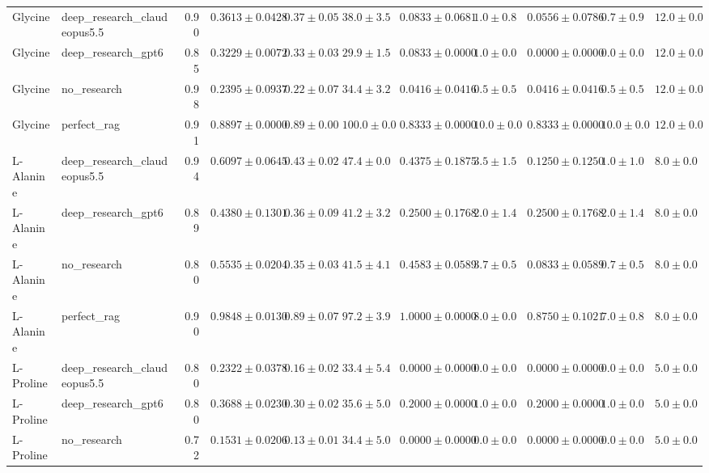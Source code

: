 \begin{table}[htbp]
\begin{tabular}{llrrrrrrrrr}
\midrule
Glycine & deep_research_claudeopus5.5 & 0.90 & $0.3613 \pm 0.0428$ & $0.37 \pm 0.05$ & $38.0 \pm 3.5$ & $0.0833 \pm 0.0681$ & $1.0 \pm 0.8$ & $0.0556 \pm 0.0786$ & $0.7 \pm 0.9$ & $12.0 \pm 0.0$ \\
Glycine & deep_research_gpt6 & 0.85 & $0.3229 \pm 0.0072$ & $0.33 \pm 0.03$ & $29.9 \pm 1.5$ & $0.0833 \pm 0.0000$ & $1.0 \pm 0.0$ & $0.0000 \pm 0.0000$ & $0.0 \pm 0.0$ & $12.0 \pm 0.0$ \\
Glycine & no_research & 0.98 & \cellcolor{red!25}$0.2395 \pm 0.0937$ & $0.22 \pm 0.07$ & $34.4 \pm 3.2$ & $0.0416 \pm 0.0416$ & $0.5 \pm 0.5$ & $0.0416 \pm 0.0416$ & $0.5 \pm 0.5$ & $12.0 \pm 0.0$ \\
Glycine & perfect_rag & 0.91 & \cellcolor{green!25}$0.8897 \pm 0.0000$ & $0.89 \pm 0.00$ & $100.0 \pm 0.0$ & $0.8333 \pm 0.0000$ & $10.0 \pm 0.0$ & $0.8333 \pm 0.0000$ & $10.0 \pm 0.0$ & $12.0 \pm 0.0$ \\
\midrule
L-Alanine & deep_research_claudeopus5.5 & 0.94 & $0.6097 \pm 0.0645$ & $0.43 \pm 0.02$ & $47.4 \pm 0.0$ & $0.4375 \pm 0.1875$ & $3.5 \pm 1.5$ & $0.1250 \pm 0.1250$ & $1.0 \pm 1.0$ & $8.0 \pm 0.0$ \\
L-Alanine & deep_research_gpt6 & 0.89 & \cellcolor{red!25}$0.4380 \pm 0.1301$ & $0.36 \pm 0.09$ & $41.2 \pm 3.2$ & $0.2500 \pm 0.1768$ & $2.0 \pm 1.4$ & $0.2500 \pm 0.1768$ & $2.0 \pm 1.4$ & $8.0 \pm 0.0$ \\
L-Alanine & no_research & 0.80 & $0.5535 \pm 0.0204$ & $0.35 \pm 0.03$ & $41.5 \pm 4.1$ & $0.4583 \pm 0.0589$ & $3.7 \pm 0.5$ & $0.0833 \pm 0.0589$ & $0.7 \pm 0.5$ & $8.0 \pm 0.0$ \\
L-Alanine & perfect_rag & 0.90 & \cellcolor{green!25}$0.9848 \pm 0.0130$ & $0.89 \pm 0.07$ & $97.2 \pm 3.9$ & $1.0000 \pm 0.0000$ & $8.0 \pm 0.0$ & $0.8750 \pm 0.1021$ & $7.0 \pm 0.8$ & $8.0 \pm 0.0$ \\
\midrule
L-Proline & deep_research_claudeopus5.5 & 0.80 & $0.2322 \pm 0.0378$ & $0.16 \pm 0.02$ & $33.4 \pm 5.4$ & $0.0000 \pm 0.0000$ & $0.0 \pm 0.0$ & $0.0000 \pm 0.0000$ & $0.0 \pm 0.0$ & $5.0 \pm 0.0$ \\
L-Proline & deep_research_gpt6 & 0.80 & $0.3688 \pm 0.0230$ & $0.30 \pm 0.02$ & $35.6 \pm 5.0$ & $0.2000 \pm 0.0000$ & $1.0 \pm 0.0$ & $0.2000 \pm 0.0000$ & $1.0 \pm 0.0$ & $5.0 \pm 0.0$ \\
L-Proline & no_research & 0.72 & \cellcolor{red!25}$0.1531 \pm 0.0206$ & $0.13 \pm 0.01$ & $34.4 \pm 5.0$ & $0.0000 \pm 0.0000$ & $0.0 \pm 0.0$ & $0.0000 \pm 0.0000$ & $0.0 \pm 0.0$ & $5.0 \pm 0.0$ \\

\end{tabular}
\end{table}
